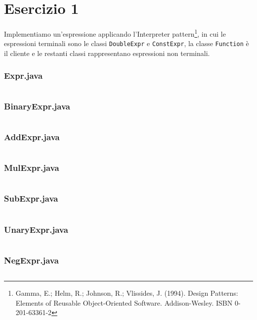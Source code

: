 \section*{Esercizio 1}

Implementiamo un'espressione applicando l'Interpreter pattern\footnote{Gamma,
E.; Helm, R.; Johnson, R.; Vlissides, J. (1994). Design Patterns: Elements of
Reusable Object-Oriented Software. Addison-Wesley. ISBN 0-201-63361-2}, in cui
le espressioni terminali sono le classi \texttt{DoubleExpr} e
\texttt{ConstExpr}, la classe \texttt{Function} è il cliente e le restanti
classi rappresentano espressioni non terminali.

\subsubsection*{Expr.java}
\inputminted{java}{tex/src/1/Expr.java}

\subsubsection*{BinaryExpr.java}
\inputminted{java}{tex/src/1/BinaryExpr.java}

\subsubsection*{AddExpr.java}
\inputminted{java}{tex/src/1/AddExpr.java}

\subsubsection*{MulExpr.java}
\inputminted{java}{tex/src/1/MulExpr.java}

\subsubsection*{SubExpr.java}
\inputminted{java}{tex/src/1/SubExpr.java}

\subsubsection*{UnaryExpr.java}
\inputminted{java}{tex/src/1/UnaryExpr.java}

\subsubsection*{NegExpr.java}
\inputminted{java}{tex/src/1/NegExpr.java}

